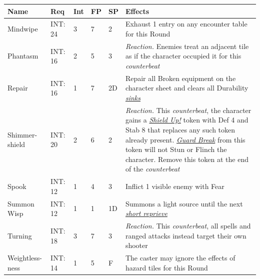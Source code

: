 \documentclass[12pt]{article}
\newcommand{\reftoit}[1]{\hyperlink{#1}{\emph{#1}}}
\begin{document}
\pagebreak

\begin{center}
\begin{tabularx}{\textwidth}{p{}p{}p{}p{}p{}p{}}
\hline
\textbf{Name} & \textbf{Req} & \textbf{Int} & \textbf{FP} & \textbf{SP} & \textbf{Effects}\setcounter{rownum}{0}\\
\hline
Mindwipe & INT: 24 & 3 & 7 & 2 & Exhaust 1 entry on any encounter table for this Round\\
Phantasm & INT: 16 & 2 & 5 & 3 & \emph{Reaction.} Enemies treat an adjacent tile as if the character occupied it for this \emph{counterbeat}\\
Repair & INT: 16 & 1 & 7 & 2D & Repair all Broken equipment on the character sheet and clears all Durability \reftoit{sinks} \\
Shimmer-\newline shield & INT: 20 & 2 & 6 & 2 & \emph{Reaction.} This \emph{counterbeat}, the character gains a \reftoit{Shield Up!} token with Def 4 and Stab 8 that replaces any such token already present. \reftoit{Guard Break} from this token will not Stun or Flinch the character. Remove this token at the end of the \emph{counterbeat}\\
Spook & INT: 12 & 1 & 4 & 3 & Inflict 1 visible enemy with Fear\\
Summon Wisp & INT: 12 & 1 & 1 & 1D & Summons a light source until the next \reftoit{short reprieve} \\
Turning & INT: 18 & 3 & 7 & 3 & \emph{Reaction.} This \emph{counterbeat}, all spells and ranged attacks instead target their own shooter\\
Weightless-\newline ness & INT: 14 & 1 & 5 & F & The caster may ignore the effects of hazard tiles for this Round\\
\hline
\end{tabularx}
\end{center}

\pagebreak
\end{document}
